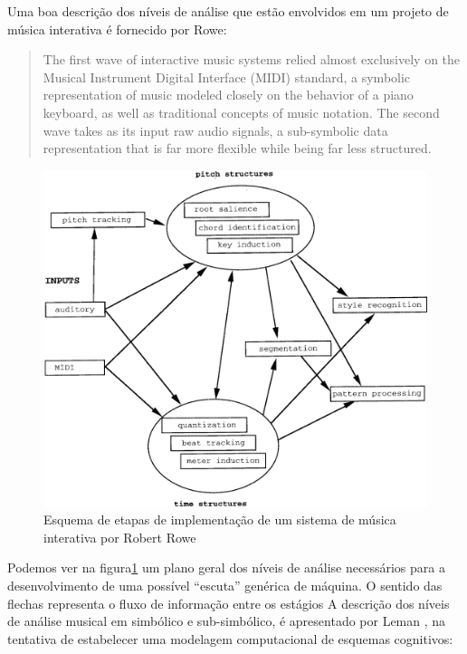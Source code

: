 \documentclass{ppgmus}
\begin{document}
Uma boa descrição dos níveis de análise que estão envolvidos em um projeto
de música interativa é fornecido por Rowe:

\begin{quotation}
 The first wave of interactive music systems relied almost exclusively on the Musical 
Instrument Digital Interface (MIDI) standard, a symbolic representation of music modeled 
closely on the behavior of a piano keyboard, as well as traditional concepts of music notation. 
The second wave takes as its input raw audio signals, a sub-symbolic data representation that is far 
more flexible while being far less structured. 
\end{quotation}


\begin{figure}
\includegraphics[scale=.6]{rowe}
\caption{Esquema de etapas de implementação de um sistema de música interativa por Robert Rowe}
\label{rowe}
\end{figure} 


Podemos ver na figura\ref{rowe} um plano geral dos níveis de análise necessários para a desenvolvimento
de uma possível ``escuta'' genérica de máquina. O sentido das flechas representa o fluxo de 
informação entre os estágios
A descrição dos níveis de análise musical em simbólico e sub-simbólico, é apresentado por Leman \cite{leman89}, 
na tentativa de estabelecer uma modelagem
computacional de esquemas cognitivos:
\end{document}
